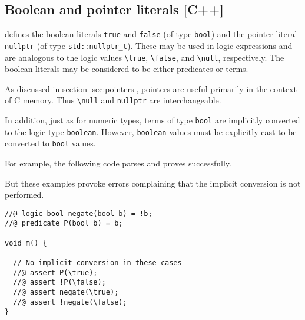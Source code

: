 \subsection{Boolean and pointer literals [C++]}

\lang defines the boolean literals
\lstinline|true| and \lstinline|false| (of type \lstinline|bool|) and the pointer literal \lstinline|nullptr| (of type \lstinline|std::nullptr_t|). 
These may be used in logic expressions and are analogous to the logic values \lstinline|\true|, 
\lstinline|\false|, and \lstinline|\null|, respectively. 
The boolean literals may be considered
to be either predicates or terms.

As discussed in section \ref{sec:pointers}, pointers are useful primarily in
the context of C memory. Thus \lstinline|\null| and \lstinline|nullptr|
are interchangeable.

In addition, just as for numeric types, terms of type \lstinline|bool| are
implicitly converted to the logic type \lstinline|boolean|.
However, \lstinline|boolean| values must be explicitly cast to be
converted to \lstinline|bool| values.

For example, the following code parses and proves successfully.



But these examples provoke errors complaining that the implicit conversion
is not performed.
\begin{lstlisting}
//@ logic bool negate(bool b) = !b;
//@ predicate P(bool b) = b;

void m() {

  // No implicit conversion in these cases
  //@ assert P(\true);
  //@ assert !P(\false);
  //@ assert negate(\true);
  //@ assert !negate(\false);
}
\end{lstlisting}
